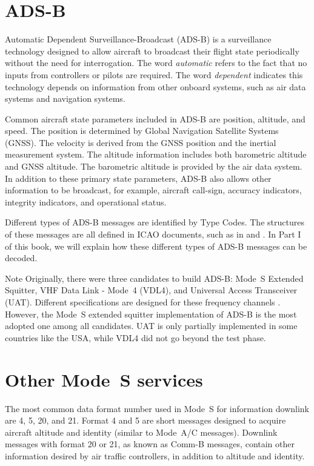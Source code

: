 \section{ADS-B}

Automatic Dependent Surveillance-Broadcast (ADS-B) is a surveillance technology designed to allow aircraft to broadcast their flight state periodically without the need for interrogation. The word \emph{automatic} refers to the fact that no inputs from controllers or pilots are required. The word \emph{dependent} indicates this technology depends on information from other onboard systems, such as air data systems and navigation systems.

Common aircraft state parameters included in ADS-B are position, altitude, and speed. The position is determined by Global Navigation Satellite Systems (GNSS). The velocity is derived from the GNSS position and the inertial measurement system. The altitude information includes both barometric altitude and GNSS altitude. The barometric altitude is provided by the air data system. In addition to these primary state parameters, ADS-B also allows other information to be broadcast, for example, aircraft call-sign, accuracy indicators, integrity indicators, and operational status.

Different types of ADS-B messages are identified by Type Codes. The structures of these messages are all defined in ICAO documents, such as in \cite{icao9871v1} and \cite{rtca2011mops}. In Part I of this book, we will explain how these different types of ADS-B messages can be decoded.

\begin{notebox}{Note}
Originally, there were three candidates to build ADS-B: Mode~S Extended Squitter, VHF Data Link - Mode~4 (VDL4), and Universal Access Transceiver (UAT). Different specifications are designed for these frequency channels \cite{rtca2011mops, rtca2002uat}. However, the Mode~S extended squitter implementation of ADS-B is the most adopted one among all candidates. UAT is only partially implemented in some countries like the USA, while VDL4 did not go beyond the test phase.
\end{notebox}


\section{Other Mode~S services}

The most common data format number used in Mode~S for information downlink are 4, 5, 20, and 21. Format 4 and 5 are short messages designed to acquire aircraft altitude and identity (similar to Mode~A/C messages). Downlink messages with format 20 or 21, as known as Comm-B messages, contain other information desired by air traffic controllers, in addition to altitude and identity.

